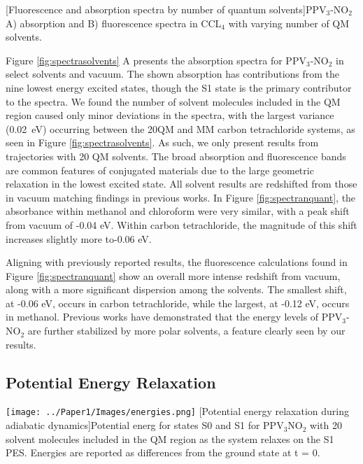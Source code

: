 \noindent
\begin{multiFigure} 
  [Fluorescence and absorption spectra by number of quantum solvents]{PPV\(_3\)-NO\(_2\) A) absorption and B) fluorescence spectra in CCL\(_4\) with varying number of QM solvents.}
  \label{fig:spectranquant}
\end{multiFigure}\bigskip

Figure \ref{fig:spectrasolvents} A presents the absorption spectra for PPV\(_3\)-NO\(_2\) in select solvents and vacuum.
The shown absorption has contributions from the nine lowest energy excited states, though the S1 state is the primary contributor to the spectra.
We found the number of solvent molecules included in the QM region caused only minor deviations in the spectra, with the largest variance (0.02~eV) occurring between the 20QM and MM carbon tetrachloride systems, as seen in Figure \ref{fig:spectrasolvents}. As such, we only present results from trajectories with 20 QM solvents.
The broad absorption and fluorescence bands are common features of conjugated materials due to the large geometric relaxation in the lowest excited state. \cite{bredas2009molecular}
All solvent results are redshifted from those in vacuum matching findings in previous works.\cite{Park2013}
In Figure \ref{fig:spectranquant}, the absorbance within methanol and chloroform were very similar, with a peak shift from vacuum of -0.04 eV.
Within carbon tetrachloride, the magnitude of this shift increases slightly more to-0.06 eV. 

Aligning with previously reported results, the fluorescence calculations found in Figure \ref{fig:spectranquant} show an overall more intense redshift from vacuum, along with a more significant dispersion among the solvents. \cite{Park2013}
The smallest shift, at -0.06 eV, occurs in carbon tetrachloride, while the largest, at -0.12 eV, occurs in methanol.
Previous works have demonstrated that the energy levels of PPV\(_3\)-NO\(_2\) are further stabilized by more polar solvents, a feature clearly seen by our results.\cite{Park2013,woo2005solvent}

\subsection{Potential Energy Relaxation}

\noindent
\begin{minipage}[c]{\textwidth}
  \centering
  \texttt{[image: ../Paper1/Images/energies.png]}
  [Potential energy relaxation during adiabatic dynamics]{Potential energ for states S0 and S1 for PPV\(_3\)NO\(_2\) with 20 solvent molecules included in the QM region as the system relaxes on the S1 PES. Energies are reported as differences from the ground state at t = 0.}
  \label{fig:energiesAdiabatic}
\end{minipage}\bigskip

